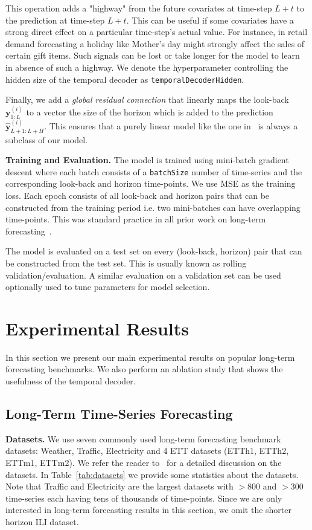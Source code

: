 \documentclass[10pt]{article} \usepackage[accepted]{tmlr}
\theoremstyle{plain}
\theoremstyle{definition}
\theoremstyle{remark}
\def\*#1{\mathbf{#1}}
\begin{document}
This operation adds a "highway" from the future covariates at time-step $L + t$ to the prediction at time-step $L+t$. This can be useful if some covariates have a strong direct effect on a particular time-step's actual value. For instance, in retail demand forecasting a holiday like Mother's day might strongly affect the sales of certain gift items. Such signals can be lost or take longer for the model to learn in absence of such a highway. We denote the hyperparameter controlling the hidden size of the temporal decoder as \texttt{temporalDecoderHidden}. 

Finally, we add a \textit{global residual connection} that linearly maps the look-back $\*y^{(i)}_{1:L}$ to a vector the size of the horizon which is added to the prediction $\hat{\*y}^{(i)}_{L+1:L+H}$. This ensures that a purely linear model like the one in~\citep{zeng2022transformers} is always a subclass of our model.

{\bf Training and Evaluation.} The model is trained using mini-batch gradient descent where each batch consists of a \texttt{batchSize} number of time-series and the corresponding look-back and horizon time-points. We use MSE as the training loss. Each epoch consists of all look-back and horizon pairs that can be constructed from the training period i.e. two mini-batches can have overlapping time-points. This was standard practice in all prior work on long-term forecasting~\citep{zeng2022transformers, liu2021pyraformer, wu2021autoformer, li2019enhancing}. 

The model is evaluated on a test set on every (look-back, horizon) pair that can be constructed from the test set. This is usually known as rolling validation/evaluation. A similar evaluation on a validation set can be used optionally used to tune parameters for model selection.


\section{Experimental Results}
\label{sec:exp}
In this section we present our main experimental results on popular long-term forecasting benchmarks. We also perform an ablation study that shows the usefulness of the temporal decoder.

\subsection{Long-Term Time-Series Forecasting}

{\bf Datasets.} We use seven commonly used long-term forecasting benchmark datasets: Weather, Traffic, Electricity and 4 ETT datasets (ETTh1, ETTh2, ETTm1, ETTm2). We  refer the reader to~\citep{wu2021autoformer} for a detailed discussion on the datasets. In Table~\ref{tab:datasets} we provide some statistics about the datasets. Note that Traffic and Electricity are the largest datasets with $>800$ and $>300$ time-series each having tens of thousands of time-points. Since we are only interested in long-term forecasting results in this section, we omit the shorter horizon ILI dataset.
\end{document}
